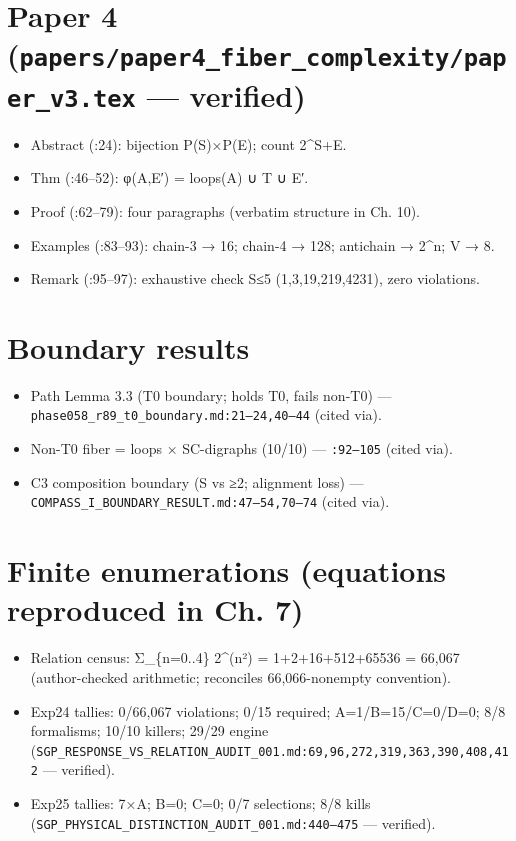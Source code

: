 \documentclass[
  11pt,
]{book}
\providecommand{\tightlist}{%
  \setlength{\itemsep}{0pt}\setlength{\parskip}{0pt}}
\begin{document}
\section{\texorpdfstring{Paper 4
(\texttt{papers/paper4\_fiber\_complexity/paper\_v3.tex} ---
verified)}{Paper 4 (papers/paper4\_fiber\_complexity/paper\_v3.tex --- verified)}}\label{paper-4-paperspaper4_fiber_complexitypaper_v3.tex-verified}

\begin{itemize}
\tightlist
\item
  Abstract (:24): bijection P(S)×P(E); count
  2\^{}\textbar S\textbar+\textbar E\textbar.
\item
  Thm (:46--52): φ(A,E′) = loops(A) ∪ T ∪ E′.
\item
  Proof (:62--79): four paragraphs (verbatim structure in Ch. 10).
\item
  Examples (:83--93): chain-3 → 16; chain-4 → 128; antichain → 2\^{}n; V
  → 8.
\item
  Remark (:95--97): exhaustive check \textbar S\textbar≤5
  (1,3,19,219,4231), zero violations.
\end{itemize}

\section{Boundary results}\label{boundary-results}

\begin{itemize}
\tightlist
\item
  Path Lemma 3.3 (T0 boundary; holds T0, fails non-T0) ---
  \texttt{phase058\_r89\_t0\_boundary.md:21–24,40–44} (cited via).
\item
  Non-T0 fiber = loops × SC-digraphs (10/10) --- \texttt{:92–105} (cited
  via).
\item
  C3 composition boundary (\textbar S vs ≥2; alignment loss)
  --- \texttt{COMPASS\_I\_BOUNDARY\_RESULT.md:47–54,70–74} (cited via).
\end{itemize}

\section{Finite enumerations (equations reproduced in Ch.
7)}\label{finite-enumerations-equations-reproduced-in-ch.-7}

\begin{itemize}
\tightlist
\item
  Relation census: Σ\_\{n=0..4\} 2\^{}(n²) = 1+2+16+512+65536 = 66,067
  (author-checked arithmetic; reconciles 66,066-nonempty convention).
\item
  Exp24 tallies: 0/66,067 violations; 0/15 required; A=1/B=15/C=0/D=0;
  8/8 formalisms; 10/10 killers; 29/29 engine
  (\texttt{SGP\_RESPONSE\_VS\_RELATION\_AUDIT\_001.md:69,96,272,319,363,390,408,412}
  --- verified).
\item
  Exp25 tallies: 7×A; B=0; C=0; 0/7 selections; 8/8 kills
  (\texttt{SGP\_PHYSICAL\_DISTINCTION\_AUDIT\_001.md:440–475} ---
  verified).
\end{itemize}
\end{document}
